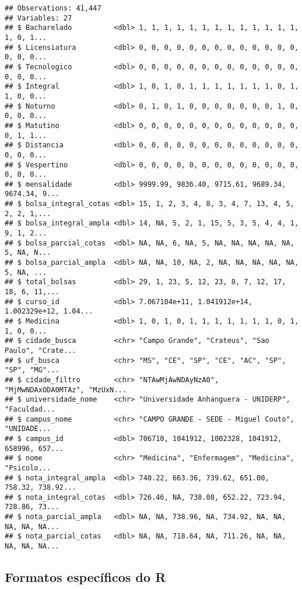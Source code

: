 \documentclass[
]{article}
\begin{document}
\begin{verbatim}
## Observations: 41,447
## Variables: 27
## $ Bacharelado          <dbl> 1, 1, 1, 1, 1, 1, 1, 1, 1, 1, 1, 1, 1, 1, 0, 1...
## $ Licensiatura         <dbl> 0, 0, 0, 0, 0, 0, 0, 0, 0, 0, 0, 0, 0, 0, 0, 0...
## $ Tecnologico          <dbl> 0, 0, 0, 0, 0, 0, 0, 0, 0, 0, 0, 0, 0, 0, 0, 0...
## $ Integral             <dbl> 1, 0, 1, 0, 1, 1, 1, 1, 1, 1, 1, 0, 1, 1, 0, 0...
## $ Noturno              <dbl> 0, 1, 0, 1, 0, 0, 0, 0, 0, 0, 0, 1, 0, 0, 0, 0...
## $ Matutino             <dbl> 0, 0, 0, 0, 0, 0, 0, 0, 0, 0, 0, 0, 0, 0, 1, 1...
## $ Distancia            <dbl> 0, 0, 0, 0, 0, 0, 0, 0, 0, 0, 0, 0, 0, 0, 0, 0...
## $ Vespertino           <dbl> 0, 0, 0, 0, 0, 0, 0, 0, 0, 0, 0, 0, 0, 0, 0, 0...
## $ mensalidade          <dbl> 9999.99, 9836.40, 9715.61, 9689.34, 9674.34, 9...
## $ bolsa_integral_cotas <dbl> 15, 1, 2, 3, 4, 8, 3, 4, 7, 13, 4, 5, 2, 2, 1,...
## $ bolsa_integral_ampla <dbl> 14, NA, 5, 2, 1, 15, 5, 3, 5, 4, 4, 1, 9, 1, 2...
## $ bolsa_parcial_cotas  <dbl> NA, NA, 6, NA, 5, NA, NA, NA, NA, NA, 5, NA, N...
## $ bolsa_parcial_ampla  <dbl> NA, NA, 10, NA, 2, NA, NA, NA, NA, NA, 5, NA, ...
## $ total_bolsas         <dbl> 29, 1, 23, 5, 12, 23, 8, 7, 12, 17, 18, 6, 11,...
## $ curso_id             <dbl> 7.067104e+11, 1.041912e+14, 1.002329e+12, 1.04...
## $ Medicina             <dbl> 1, 0, 1, 0, 1, 1, 1, 1, 1, 1, 1, 0, 1, 1, 0, 0...
## $ cidade_busca         <chr> "Campo Grande", "Crateus", "Sao Paulo", "Crate...
## $ uf_busca             <chr> "MS", "CE", "SP", "CE", "AC", "SP", "SP", "MG"...
## $ cidade_filtro        <chr> "NTAwMjAwNDAyNzA0", "MjMwNDAxODA0MTAz", "MzUxN...
## $ universidade_nome    <chr> "Universidade Anhanguera - UNIDERP", "Faculdad...
## $ campus_nome          <chr> "CAMPO GRANDE - SEDE - Miguel Couto", "UNIDADE...
## $ campus_id            <dbl> 706710, 1041912, 1002328, 1041912, 658996, 657...
## $ nome                 <chr> "Medicina", "Enfermagem", "Medicina", "Psicolo...
## $ nota_integral_ampla  <dbl> 740.22, 663.36, 739.62, 651.00, 758.32, 738.92...
## $ nota_integral_cotas  <dbl> 726.46, NA, 738.08, 652.22, 723.94, 728.86, 73...
## $ nota_parcial_ampla   <dbl> NA, NA, 738.96, NA, 734.92, NA, NA, NA, NA, NA...
## $ nota_parcial_cotas   <dbl> NA, NA, 718.64, NA, 711.26, NA, NA, NA, NA, NA...
\end{verbatim}

\hypertarget{formatos-especuxedficos-do-r}{%
\subsection{Formatos específicos do
R}\label{formatos-especuxedficos-do-r}}
\end{document}
